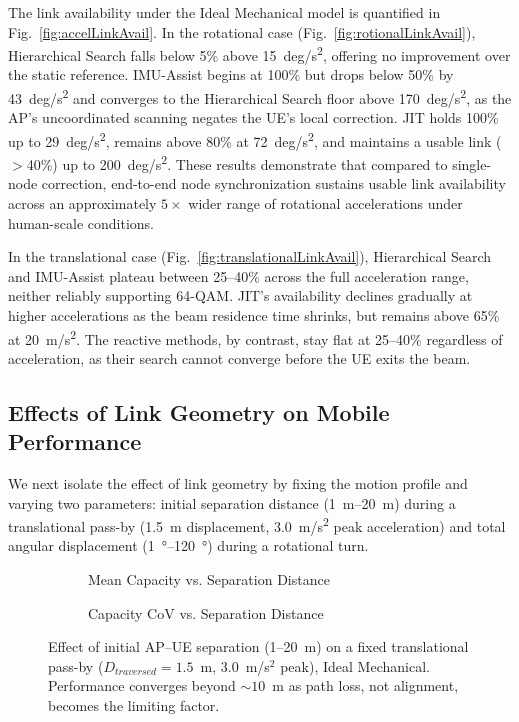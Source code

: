 \documentclass[fleqn,10pt]{wlscirep}
\begin{document}
The link availability under the Ideal Mechanical model is quantified in Fig.~\ref{fig:accelLinkAvail}. In the rotational case (Fig.~\ref{fig:rotionalLinkAvail}), Hierarchical Search falls below 5\% above \SI{15}{deg/s^2}, offering no improvement over the static reference. IMU-Assist begins at 100\% but drops below 50\% by \SI{43}{deg/s^2} and converges to the Hierarchical Search floor above \SI{170}{deg/s^2}, as the AP's uncoordinated scanning negates the UE's local correction. JIT holds 100\% up to \SI{29}{deg/s^2}, remains above 80\% at \SI{72}{deg/s^2}, and maintains a usable link ($>$40\%) up to \SI{200}{deg/s^2}. These results demonstrate that compared to single-node correction, end-to-end node synchronization sustains usable link availability across an approximately $5\times$ wider range of rotational accelerations under human-scale conditions.

In the translational case (Fig.~\ref{fig:translationalLinkAvail}), Hierarchical Search and IMU-Assist plateau between 25--40\% across the full acceleration range, neither reliably supporting 64-QAM. JIT's availability declines gradually at higher accelerations as the beam residence time shrinks, but remains above 65\% at \SI{20}{m/s^2}. The reactive methods, by contrast, stay flat at 25--40\% regardless of acceleration, as their search cannot converge before the UE exits the beam.



\subsection*{Effects of Link Geometry on Mobile Performance}

We next isolate the effect of link geometry by fixing the motion profile and varying two parameters: initial separation distance (\SIrange{1}{20}{m}) during a translational pass-by (\SI{1.5}{m} displacement, \SI{3.0}{m/s^2} peak acceleration) and total angular displacement (\SIrange{1}{120}{\degree}) during a rotational turn.

\begin{figure}[h!]
    \centering
    \begin{subfigure}{0.495\linewidth}
        
        \vspace{-25pt}
        \caption{Mean Capacity vs. Separation Distance}
        \label{fig:dist_rate}
    \end{subfigure}
    \hfill
    \begin{subfigure}{0.495\linewidth}
        
        \vspace{-25pt}
        \caption{Capacity CoV vs. Separation Distance}
        \label{fig:dist_cov}
    \end{subfigure}
    \caption{Effect of initial AP--UE separation (1--20~m) on a fixed translational pass-by ($D_{traversed} = 1.5$~m, $3.0$~m/s$^2$ peak), Ideal Mechanical. Performance converges beyond ${\sim}10$~m as path loss, not alignment, becomes the limiting factor.}
    \vspace{-5pt}
\end{figure}
\end{document}
